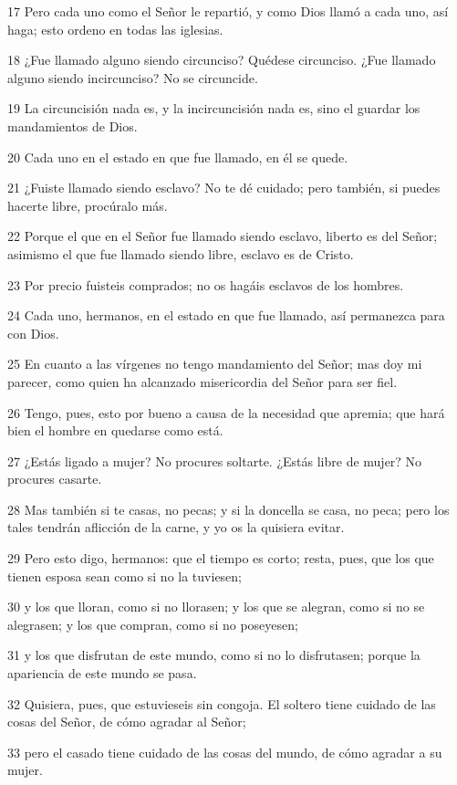 \par 17 Pero cada uno como el Señor le repartió, y como Dios llamó a cada uno, así haga; esto ordeno en todas las iglesias.
\par 18 ¿Fue llamado alguno siendo circunciso? Quédese circunciso. ¿Fue llamado alguno siendo incircunciso? No se circuncide.
\par 19 La circuncisión nada es, y la incircuncisión nada es, sino el guardar los mandamientos de Dios.
\par 20 Cada uno en el estado en que fue llamado, en él se quede.
\par 21 ¿Fuiste llamado siendo esclavo? No te dé cuidado; pero también, si puedes hacerte libre, procúralo más.
\par 22 Porque el que en el Señor fue llamado siendo esclavo, liberto es del Señor; asimismo el que fue llamado siendo libre, esclavo es de Cristo.
\par 23 Por precio fuisteis comprados; no os hagáis esclavos de los hombres.
\par 24 Cada uno, hermanos, en el estado en que fue llamado, así permanezca para con Dios.
\par 25 En cuanto a las vírgenes no tengo mandamiento del Señor; mas doy mi parecer, como quien ha alcanzado misericordia del Señor para ser fiel.
\par 26 Tengo, pues, esto por bueno a causa de la necesidad que apremia; que hará bien el hombre en quedarse como está.
\par 27 ¿Estás ligado a mujer? No procures soltarte. ¿Estás libre de mujer? No procures casarte.
\par 28 Mas también si te casas, no pecas; y si la doncella se casa, no peca; pero los tales tendrán aflicción de la carne, y yo os la quisiera evitar.
\par 29 Pero esto digo, hermanos: que el tiempo es corto; resta, pues, que los que tienen esposa sean como si no la tuviesen;
\par 30 y los que lloran, como si no llorasen; y los que se alegran, como si no se alegrasen; y los que compran, como si no poseyesen;
\par 31 y los que disfrutan de este mundo, como si no lo disfrutasen; porque la apariencia de este mundo se pasa.
\par 32 Quisiera, pues, que estuvieseis sin congoja. El soltero tiene cuidado de las cosas del Señor, de cómo agradar al Señor;
\par 33 pero el casado tiene cuidado de las cosas del mundo, de cómo agradar a su mujer.
